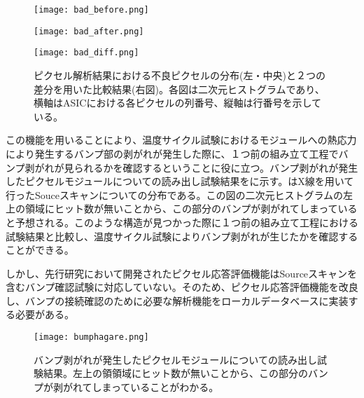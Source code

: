 \begin{figure}[tbp]
 \begin{minipage}{0.33\hsize}
  \begin{center}
   \texttt{[image: bad\_before.png]}
  \end{center}
 \end{minipage}
 \begin{minipage}{0.33\hsize}
 \begin{center}
  \texttt{[image: bad\_after.png]}
 \end{center}
 \end{minipage}
 \begin{minipage}{0.33\hsize}
 \begin{center}
  \texttt{[image: bad\_diff.png]}
 \end{center}
 \end{minipage}
 \caption{ピクセル解析結果における不良ピクセルの分布(左・中央)と２つの差分を用いた比較結果(右図)。各図は二次元ヒストグラムであり、横軸はASICにおける各ピクセルの列番号、縦軸は行番号を示している。}
 \label{fig:badpixel}
\end{figure}

この機能を用いることにより、温度サイクル試験におけるモジュールへの熱応力により発生するバンプ部の剥がれが発生した際に、１つ前の組み立て工程でバンプ剥がれが見られるかを確認するということに役に立つ。バンプ剥がれが発生したピクセルモジュールについての読み出し試験結果をに示す。はX線を用いて行ったSouceスキャンについての分布である。この図の二次元ヒストグラムの左上の領域にヒット数が無いことから、この部分のバンプが剥がれてしまっていると予想される。このような構造が見つかった際に１つ前の組み立て工程における試験結果と比較し、温度サイクル試験によりバンプ剥がれが生じたかを確認することができる。

しかし、先行研究において開発されたピクセル応答評価機能はSourceスキャンを含むバンプ確認試験に対応していない。そのため、ピクセル応答評価機能を改良し、バンプの接続確認のために必要な解析機能をローカルデータベースに実装する必要がある。


\begin{figure}[tbp]
  \centering
  \texttt{[image: bumphagare.png]}
  \caption[バンプ剥がれが発生したピクセルモジュールについての読み出し試験結果]{バンプ剥がれが発生したピクセルモジュールについての読み出し試験結果。左上の領領域にヒット数が無いことから、この部分のバンプが剥がれてしまっていることがわかる。}
  \label{fig:bumphagare}
\end{figure}



